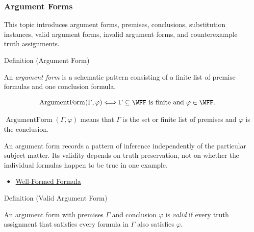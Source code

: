 \subsubsection*{Argument Forms}

\begin{remark*}
This topic introduces argument forms, premises, conclusions, substitution
instances, valid argument forms, invalid argument forms, and counterexample
truth assignments.
\end{remark*}

\begin{definitionbox}{Definition (Argument Form)}
\begin{definition}
\label{def:argument-form-propositional-logic}
An \emph{argument form} is a schematic pattern consisting of a finite list of
premise formulas and one conclusion formula.
\end{definition}
\end{definitionbox}

\begin{remark*}
\[
\operatorname{ArgumentForm}(\Gamma,\varphi)
\Longleftrightarrow
\Gamma\subseteq\WFF\text{ is finite and }\varphi\in\WFF.
\]
\end{remark*}

\begin{remark*}
\(\operatorname{ArgumentForm}(\Gamma,\varphi)\) means that \(\Gamma\) is the set
or finite list of premises and \(\varphi\) is the conclusion.
\end{remark*}

\begin{remark*}[Interpretation]
An argument form records a pattern of inference independently of the particular
subject matter. Its validity depends on truth preservation, not on whether the
individual formulas happen to be true in one example.
\end{remark*}

\begin{dependencies}
\begin{itemize}
  \item \hyperref[def:well-formed-formula]{Well-Formed Formula}
\end{itemize}
\end{dependencies}

\begin{definitionbox}{Definition (Valid Argument Form)}
\begin{definition}
\label{def:valid-argument-form-propositional-logic}
An argument form with premises \(\Gamma\) and conclusion \(\varphi\) is
\emph{valid} if every truth assignment that satisfies every formula in
\(\Gamma\) also satisfies \(\varphi\).
\end{definition}
\end{definitionbox}

